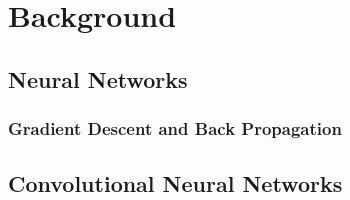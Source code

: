 

\enlargethispage{-1\baselineskip}

\chapter{Background}

\lipsum[1-2]

\section{Neural Networks}

\lipsum[3]

\subsection{Gradient Descent and Back Propagation}

\lipsum[4]

\section{Convolutional Neural Networks}

\lipsum[5-6]




